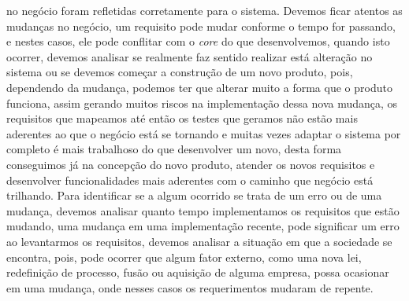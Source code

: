       no negócio foram refletidas corretamente para o sistema. \newline
      Devemos ficar atentos as mudanças no negócio, um requisito pode mudar conforme
      o tempo for passando, e nestes casos, ele pode conflitar com o \textit{core}
      do que desenvolvemos, quando isto ocorrer, devemos analisar se realmente faz
      sentido realizar está alteração no sistema ou se devemos começar a construção
      de um novo produto, pois, dependendo da mudança, podemos ter que alterar muito
      a forma que o produto funciona, assim gerando muitos riscos na implementação
      dessa nova mudança, os requisitos que mapeamos até então os testes que
      geramos não estão mais aderentes ao que o negócio está se tornando e muitas
      vezes adaptar o sistema por completo é mais trabalhoso do que desenvolver um
      novo, desta forma conseguimos já na concepção do novo produto, atender os
      novos requisitos e desenvolver funcionalidades mais aderentes com o caminho
      que negócio está trilhando. Para identificar se a algum ocorrido se trata de
      um erro ou de uma mudança, devemos analisar quanto tempo implementamos os
      requisitos que estão mudando, uma mudança em uma implementação recente, pode
      significar um erro ao levantarmos os requisitos, devemos analisar a situação
      em que a sociedade se encontra, pois, pode ocorrer que algum fator externo, como
      uma nova lei, redefinição de processo, fusão ou aquisição de alguma empresa,
      possa ocasionar em uma mudança, onde nesses casos os requerimentos mudaram
      de repente.

